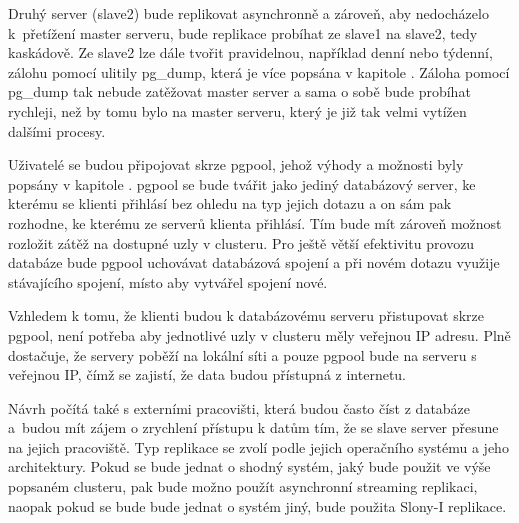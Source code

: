 Druhý server (slave2) bude replikovat asynchronně a zároveň, aby nedocházelo k~přetížení master serveru, bude replikace probíhat ze slave1 na slave2, tedy kaskádově. Ze slave2 lze dále tvořit pravidelnou, například denní nebo týdenní, zálohu pomocí ulitily pg\_dump, která je více popsána v kapitole . Záloha pomocí pg\_dump tak nebude zatěžovat master server a sama o sobě bude probíhat rychleji, než by tomu bylo na master serveru, který je již tak velmi vytížen dalšími procesy.

Uživatelé se budou připojovat skrze pgpool, jehož výhody a možnosti byly popsány v kapitole . pgpool se bude tvářit jako jediný databázový server, ke kterému se klienti přihlásí bez ohledu na typ jejich dotazu a on sám pak rozhodne, ke kterému ze serverů klienta přihlásí. Tím bude mít zároveň možnost rozložit zátěž na dostupné uzly v clusteru. Pro ještě větší efektivitu provozu databáze bude pgpool uchovávat databázová spojení a při novém dotazu využije stávajícího spojení, místo aby vytvářel spojení nové. 

Vzhledem k tomu, že klienti budou k databázovému serveru přistupovat skrze pgpool, není potřeba aby jednotlivé uzly v clusteru měly veřejnou IP adresu. Plně dostačuje, že servery poběží na lokální síti a pouze pgpool bude na serveru s veřejnou IP, čímž se zajistí, že data budou přístupná z internetu. 

Návrh počítá také s externími pracovišti, která budou často číst z databáze a~budou mít zájem o zrychlení přístupu k datům tím, že se slave server přesune na jejich pracoviště. Typ replikace se zvolí podle jejich operačního systému a jeho architektury. Pokud se bude jednat o shodný systém, jaký bude použit ve výše popsaném clusteru, pak bude možno použít asynchronní streaming replikaci, naopak pokud se bude bude jednat o systém jiný, bude použita Slony-I replikace. 

